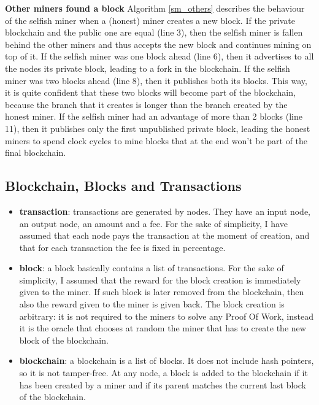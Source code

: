 \documentclass{article}
\begin{document}
\begin{itemize}
\textbf{Other miners found a block} Algorithm \ref{sm_others} describes the behaviour of the selfish miner when a (honest) miner creates a new block. If the private blockchain and the public one are equal (line 3), then the selfish miner is fallen behind the other miners and thus accepts the new block and continues mining on top of it. If the selfish miner was one block ahead (line 6), then it advertises to all the nodes its private block, leading to a fork in the blockchain. If the selfish miner was two blocks ahead (line 8), then it publishes both its blocks. This way, it is quite confident that these two blocks will become part of the blockchain, because the branch that it creates is longer than the branch created by the honest miner. If the selfish miner had an advantage of more than 2 blocks (line 11), then it publishes only the first unpublished private block, leading the honest miners to spend clock cycles to mine blocks that at the end won't be part of the final blockchain.
\end{itemize}





\subsection{Blockchain, Blocks and Transactions} 
\begin{itemize}
\item \textbf{transaction}: transactions are generated by nodes. They have an input node, an output node, an amount and a fee. For the sake of simplicity, I have assumed that each node pays the transaction at the moment of creation, and that for each transaction the fee is fixed in percentage.
\item{\textbf{block}}: a block basically contains a list of transactions. For the sake of simplicity, I assumed that the reward for the block creation is immediately given to the miner. If such block is later removed from the blockchain, then also the reward given to the miner is given back. The block creation is arbitrary: it is not required to the miners to solve any Proof Of Work, instead it is the oracle that chooses at random the miner that has to create the new block of the blockchain. 
\item{\textbf{blockchain}}: a blockchain is a list of blocks. It does not include hash pointers, so it is not tamper-free. At any node, a block is added to the blockchain if it has been created by a miner and if its parent matches the current last block of the blockchain.
\end{itemize}
\end{document}
